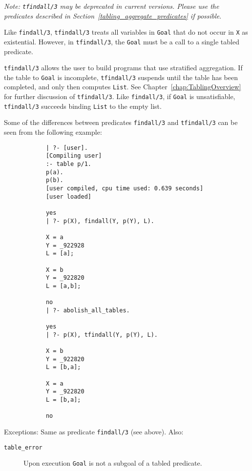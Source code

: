 \begin{description}
    {\em Note: {\tt tfindall/3} may be deprecated in current versions.
    Please use the predicates described in
    Section~\ref{tabling_aggregate_predicates} if possible}.

    Like {\tt findall/3}, {\tt tfindall/3} treats all variables in
    {\tt Goal} that do not occur in {\tt X} as existential.  However,
    in {\tt tfindall/3}, the {\tt Goal} must be a call to a single
    tabled predicate.
	
    {\tt tfindall/3} allows the user to build programs that use
    stratified aggregation.  If the table to {\tt Goal} is incomplete,
    {\tt tfindall/3} suspends until the table has been completed, and
    only then computes {\tt List}.  See Chapter~\ref{chap:TablingOverview}
    for further discussion of {\tt tfindall/3}.  Like {\tt findall/3},
    if {\tt Goal} is unsatisfiable, {\tt tfindall/3} succeeds binding
    {\tt List} to the empty list.

    Some of the differences between predicates {\tt findall/3} and
    {\tt tfindall/3} can be seen from the following example:

    {\footnotesize
    \begin{verbatim}
            | ?- [user].
            [Compiling user]
            :- table p/1.
            p(a).
            p(b).
            [user compiled, cpu time used: 0.639 seconds]
            [user loaded]

            yes
            | ?- p(X), findall(Y, p(Y), L).

            X = a
            Y = _922928
            L = [a];

            X = b
            Y = _922820
            L = [a,b];

            no
            | ?- abolish_all_tables.

            yes
            | ?- p(X), tfindall(Y, p(Y), L).

            X = b
            Y = _922820
            L = [b,a];

            X = a
            Y = _922820
            L = [b,a];

            no
    \end{verbatim}
    }

    Exceptions: Same as predicate {\tt findall/3} (see above).  Also:
    \begin{description}
    \item[{\tt table\_error}]
	Upon execution {\tt Goal} is not a subgoal of a tabled predicate.
    \end{description}


\end{description}
